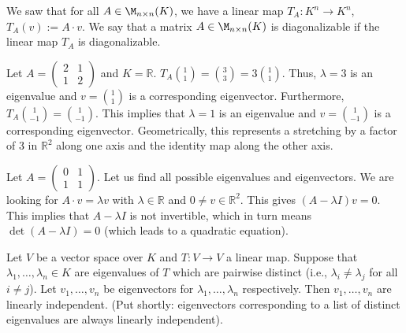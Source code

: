 \begin{remark}\label{rem:diagonalizable_matrix}
  We saw that for all $A \in \M_{n \times n}(K)$, we have a linear map $T_A: K^n \rightarrow K^n$, $T_A(v) := A \cdot v$. We say that a matrix $A \in \M_{n \times n}(K)$ is diagonalizable if the linear map $T_A$ is diagonalizable.
\end{remark}

\begin{example}\label{ex:eigenvalue_R2_stretch}
  Let $A = \left(\begin{smallmatrix} 2 & 1 \\ 1 & 2 \end{smallmatrix}\right)$ and $K = \mathbb{R}$.
  $T_A \binom{1}{1} = \binom{3}{3} = 3 \binom{1}{1}$. Thus, $\lambda = 3$ is an eigenvalue and $v = \binom{1}{1}$ is a corresponding eigenvector.
  Furthermore, $T_A \binom{1}{-1} = \binom{1}{-1}$. This implies that $\lambda = 1$ is an eigenvalue and $v = \binom{1}{-1}$ is a corresponding eigenvector.
  Geometrically, this represents a stretching by a factor of 3 in $\mathbb{R}^2$ along one axis and the identity map along the other axis.
\end{example}

\begin{example}\label{ex:eigenvalue_R2_quadratic}
  Let $A = \left(\begin{smallmatrix} 0 & 1 \\ 1 & 1 \end{smallmatrix}\right)$. Let us find all possible eigenvalues and eigenvectors.
  We are looking for $A \cdot v = \lambda v$ with $\lambda \in \mathbb{R}$ and $0 \ne v \in \mathbb{R}^2$.
  This gives $(A - \lambda I)v = 0$. This implies that $A - \lambda I$ is not invertible, which in turn means $\det(A - \lambda I) = 0$ (which leads to a quadratic equation).
\end{example}

\begin{proposition} \label{prop:lin_indep_eigen}
  Let $V$ be a vector space over $K$ and $T: V \rightarrow V$ a linear map. Suppose that $\lambda_1, \dots, \lambda_n \in K$ are eigenvalues of $T$ which are pairwise distinct (i.e., $\lambda_i \ne \lambda_j$ for all $i \ne j$). Let $v_1, \dots, v_n$ be eigenvectors for $\lambda_1, \dots, \lambda_n$ respectively. Then $v_1, \dots, v_n$ are linearly independent. (Put shortly: eigenvectors corresponding to a list of distinct eigenvalues are always linearly independent).
\end{proposition}

